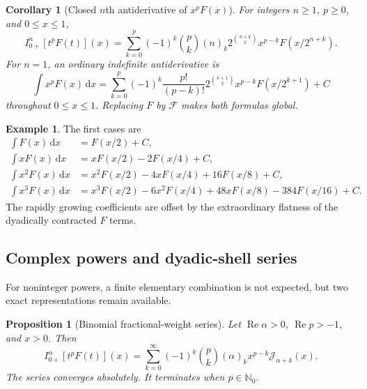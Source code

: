 \documentclass[11pt]{article}
\newtheorem{proposition}[theorem]{Proposition}
\newtheorem{corollary}[theorem]{Corollary}
\theoremstyle{definition}
\newtheorem{example}[theorem]{Example}
\theoremstyle{remark}
\newcommand{\N}{\mathbb N}
\newcommand{\dd}{\,\mathrm d}
\newcommand{\Ree}{\operatorname{Re}}
\newcommand{\poch}[2]{(#1)_{#2}}
\newcommand{\extF}{\mathcal F}
\newcommand{\J}{\mathcal J}
\begin{document}
\begin{corollary}[Closed $n$th antiderivative of $x^pF(x)$]
\label{cor:nth-weighted-primitive}
For integers $n\ge1$, $p\ge0$, and $0\le x\le1$,
\begin{equation}
 I_{0+}^{n}[t^pF(t)](x)
 =\sum_{k=0}^{p}(-1)^k\binom pk\poch{n}{k}
 2^{\binom{n+k}{2}}x^{p-k}F(x/2^{n+k}).
 \label{eq:nth-weighted-primitive}
\end{equation}
For $n=1$, an ordinary indefinite antiderivative is
\begin{equation}
 \boxed{
 \int x^pF(x)\dd x=
 \sum_{k=0}^{p}(-1)^k\frac{p!}{(p-k)!}
 2^{\binom{k+1}{2}}x^{p-k}F(x/2^{k+1})+C }
 \label{eq:weighted-ordinary-antiderivative}
\end{equation}
throughout $0\le x\le1$.  Replacing $F$ by $\extF$ makes both formulas global.
\end{corollary}

\begin{example}
The first cases are
\begin{align*}
 \int F(x)\dd x&=F(x/2)+C,\\
 \int xF(x)\dd x&=xF(x/2)-2F(x/4)+C,\\
 \int x^2F(x)\dd x&=x^2F(x/2)-4xF(x/4)+16F(x/8)+C,\\
 \int x^3F(x)\dd x&=x^3F(x/2)-6x^2F(x/4)+48xF(x/8)-384F(x/16)+C.
\end{align*}
The rapidly growing coefficients are offset by the extraordinary flatness of the dyadically
contracted $F$ terms.
\end{example}

\subsection{Complex powers and dyadic-shell series}

For noninteger powers, a finite elementary combination is not expected, but two exact
representations remain available.

\begin{proposition}[Binomial fractional-weight series]
\label{prop:complex-power-series}
Let $\Ree\alpha>0$, $\Ree p>-1$, and $x>0$.  Then
\begin{equation}
 I_{0+}^{\alpha}[t^pF(t)](x)
 =\sum_{k=0}^{\infty}(-1)^k\binom pk\poch{\alpha}{k}
 x^{p-k}\J_{\alpha+k}(x).
 \label{eq:complex-power-series}
\end{equation}
The series converges absolutely.  It terminates when $p\in\N_0$.
\end{proposition}
\end{document}
